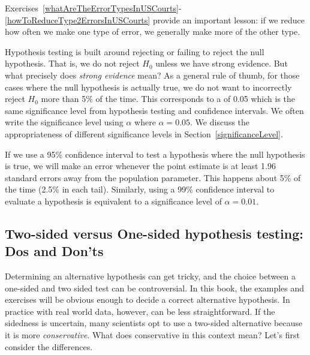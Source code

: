 Exercises~\ref{whatAreTheErrorTypesInUSCourts}-\ref{howToReduceType2ErrorsInUSCourts} provide an important lesson: if we reduce how often we make one type of error, we generally make more of the other type.

Hypothesis testing is built around rejecting or failing to reject the null hypothesis. That is, we do not reject $H_0$ unless we have strong evidence. But what precisely does \emph{strong evidence} mean? As a general rule of thumb, for those cases where the null hypothesis is actually true, we do not want to incorrectly reject $H_0$ more than 5\% of the time. This corresponds to a  of 0.05 which is the same significance level from hypothesis testing and confidence intervals. We often write the significance level using $\alpha$ where $\alpha = 0.05$. We discuss the appropriateness of different significance levels in Section~\ref{significanceLevel}.

If we use a 95\% confidence interval to test a hypothesis where the null hypothesis is true, we will make an error whenever the point estimate is at least 1.96 standard errors away from the population parameter. This happens about 5\% of the time (2.5\% in each tail). Similarly, using a 99\% confidence interval to evaluate a hypothesis is equivalent to a significance level of $\alpha = 0.01$.

\subsection{Two-sided versus One-sided hypothesis testing: Dos and Don'ts}
\label{twoSidedTestsWithPValues}


Determining an alternative hypothesis can get tricky, and the choice between a one-sided and two sided test can be controversial. In this book, the examples and exercises will be obvious enough to decide a correct alternative hypothesis. In practice with real world data, however, can be less straightforward. If the sidedness is uncertain, many scientists opt to use a two-sided alternative because it is more \emph{conservative}. What does conservative in this context mean? Let's first consider the differences.

